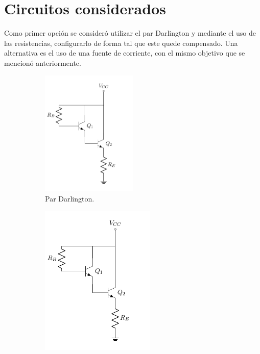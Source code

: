 \section{Circuitos considerados}
Como primer opción se consideró utilizar el par Darlington y mediante el uso de las resistencias, configurarlo de forma tal que este quede compensado. Una alternativa es el uso de una fuente de corriente, con el mismo objetivo que se mencionó anteriormente.
\begin{figure}[H]
\centering
\begin{subfigure}{.45\textwidth}
\centering
	\includegraphics[width=0.5\textwidth, page=1]{Imagenes/ParDarlington.pdf}
	\caption{Par Darlington.}
	\label{fig:pardar1}
\end{subfigure}
\begin{subfigure}{.4\textwidth}
\centering
	\includegraphics[width=0.6\textwidth, page=2]{Imagenes/ParDarlington.pdf}

\end{subfigure}
\end{figure}
